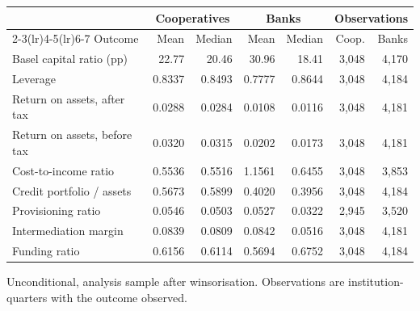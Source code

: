 \begin{tabular}{lrrrrrr}
\toprule
 & \multicolumn{2}{c}{Cooperatives} & \multicolumn{2}{c}{Banks} & \multicolumn{2}{c}{Observations} \\
\cmidrule(lr){2-3}\cmidrule(lr){4-5}\cmidrule(lr){6-7}
Outcome & Mean & Median & Mean & Median & Coop. & Banks \\
\midrule
Basel capital ratio (pp) & 22.77 & 20.46 & 30.96 & 18.41 & 3,048 & 4,170 \\
Leverage & 0.8337 & 0.8493 & 0.7777 & 0.8644 & 3,048 & 4,184 \\
Return on assets, after tax & 0.0288 & 0.0284 & 0.0108 & 0.0116 & 3,048 & 4,181 \\
Return on assets, before tax & 0.0320 & 0.0315 & 0.0202 & 0.0173 & 3,048 & 4,181 \\
Cost-to-income ratio & 0.5536 & 0.5516 & 1.1561 & 0.6455 & 3,048 & 3,853 \\
Credit portfolio / assets & 0.5673 & 0.5899 & 0.4020 & 0.3956 & 3,048 & 4,184 \\
Provisioning ratio & 0.0546 & 0.0503 & 0.0527 & 0.0322 & 2,945 & 3,520 \\
Intermediation margin & 0.0839 & 0.0809 & 0.0842 & 0.0516 & 3,048 & 4,181 \\
Funding ratio & 0.6156 & 0.6114 & 0.5694 & 0.6752 & 3,048 & 4,184 \\
\bottomrule
\end{tabular}
\begin{tablenotes}[flushleft]\footnotesize
\item Unconditional, analysis sample after winsorisation. Observations are institution-quarters with the outcome observed.
\end{tablenotes}
